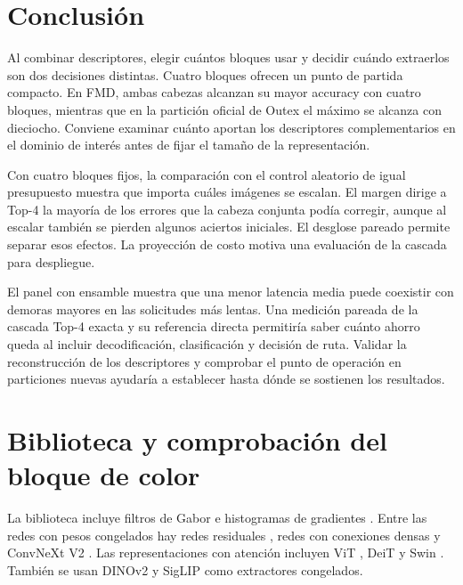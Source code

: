 \documentclass[a4paper,fleqn]{cas-sc}
\begin{document}
\section{Conclusión}

Al combinar descriptores, elegir cuántos bloques usar y decidir cuándo extraerlos son dos decisiones distintas. Cuatro bloques ofrecen un punto de partida compacto. En FMD, ambas cabezas alcanzan su mayor accuracy con cuatro bloques, mientras que en la partición oficial de Outex el máximo se alcanza con dieciocho. Conviene examinar cuánto aportan los descriptores complementarios en el dominio de interés antes de fijar el tamaño de la representación.

Con cuatro bloques fijos, la comparación con el control aleatorio de igual presupuesto muestra que importa cuáles imágenes se escalan. El margen dirige a Top-4 la mayoría de los errores que la cabeza conjunta podía corregir, aunque al escalar también se pierden algunos aciertos iniciales. El desglose pareado permite separar esos efectos. La proyección de costo motiva una evaluación de la cascada para despliegue.

El panel con ensamble muestra que una menor latencia media puede coexistir con demoras mayores en las solicitudes más lentas. Una medición pareada de la cascada Top-4 exacta y su referencia directa permitiría saber cuánto ahorro queda al incluir decodificación, clasificación y decisión de ruta. Validar la reconstrucción de los descriptores y comprobar el punto de operación en particiones nuevas ayudaría a establecer hasta dónde se sostienen los resultados.

\appendix
\section{Biblioteca y comprobación del bloque de color}

La biblioteca incluye filtros de Gabor \citep{jain1991gabor} e histogramas de gradientes \citep{dalal2005hog}. Entre las redes con pesos congelados hay redes residuales \citep{he2016resnet}, redes con conexiones densas \citep{huang2017densenet} y ConvNeXt V2 \citep{woo2023convnextv2}. Las representaciones con atención incluyen ViT \citep{dosovitskiy2021vit}, DeiT \citep{touvron2021deit} y Swin \citep{liu2021swin}. También se usan DINOv2 \citep{oquab2024dinov2} y SigLIP \citep{zhai2023siglip} como extractores congelados.
\end{document}
